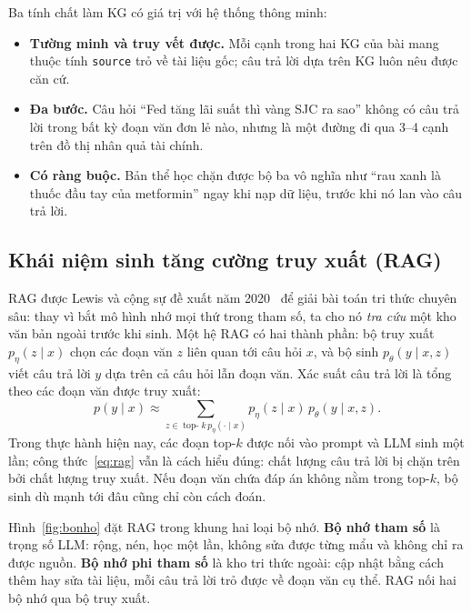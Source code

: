 Ba tính chất làm KG có giá trị với hệ thống thông minh:
\begin{itemize}
  \item \textbf{Tường minh và truy vết được.} Mỗi cạnh trong hai KG của bài mang thuộc tính \texttt{source} trỏ về
        tài liệu gốc; câu trả lời dựa trên KG luôn nêu được căn cứ.
  \item \textbf{Đa bước.} Câu hỏi ``Fed tăng lãi suất thì vàng SJC ra sao'' không có câu trả lời trong bất kỳ
        đoạn văn đơn lẻ nào, nhưng là một đường đi qua 3--4 cạnh trên đồ thị nhân quả tài chính.
  \item \textbf{Có ràng buộc.} Bản thể học chặn được bộ ba vô nghĩa như ``rau xanh là thuốc đầu tay của metformin''
        ngay khi nạp dữ liệu, trước khi nó lan vào câu trả lời.
\end{itemize}

\subsection{Khái niệm sinh tăng cường truy xuất (RAG)}
RAG được Lewis và cộng sự đề xuất năm 2020~\cite{lewis2020rag} để giải bài toán tri thức chuyên sâu: thay vì bắt
mô hình nhớ mọi thứ trong tham số, ta cho nó \emph{tra cứu} một kho văn bản ngoài trước khi sinh. Một hệ RAG có
hai thành phần: bộ truy xuất $p_\eta(z \mid x)$ chọn các đoạn văn $z$ liên quan tới câu hỏi $x$, và bộ sinh
$p_\theta(y \mid x, z)$ viết câu trả lời $y$ dựa trên cả câu hỏi lẫn đoạn văn. Xác suất câu trả lời là tổng theo
các đoạn văn được truy xuất:
\begin{equation}
  p(y \mid x) \approx \sum_{z \in \operatorname{top-}k\, p_\eta(\cdot \mid x)} p_\eta(z \mid x)\, p_\theta(y \mid x, z).
  \label{eq:rag}
\end{equation}
Trong thực hành hiện nay, các đoạn top-$k$ được nối vào prompt và LLM sinh một lần; công thức~\eqref{eq:rag} vẫn
là cách hiểu đúng: chất lượng câu trả lời bị chặn trên bởi chất lượng truy xuất. Nếu đoạn văn chứa đáp án không
nằm trong top-$k$, bộ sinh dù mạnh tới đâu cũng chỉ còn cách đoán.

Hình~\ref{fig:bonho} đặt RAG trong khung hai loại bộ nhớ. \textbf{Bộ nhớ tham số} là trọng số LLM: rộng, nén, học
một lần, không sửa được từng mẩu và không chỉ ra được nguồn. \textbf{Bộ nhớ phi tham số} là kho tri thức ngoài:
cập nhật bằng cách thêm hay sửa tài liệu, mỗi câu trả lời trỏ được về đoạn văn cụ thể. RAG nối hai bộ nhớ qua bộ
truy xuất.


